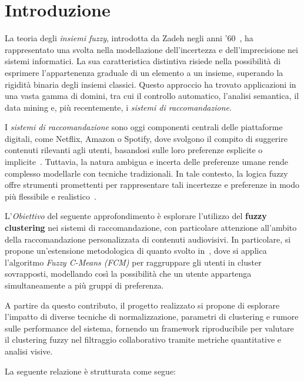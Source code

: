 \chapter{Introduzione}
\label{chap:chap1}

La teoria degli \emph{insiemi fuzzy}, introdotta da Zadeh negli anni ’60~\cite{Goguen_1973}, ha rappresentato una svolta nella modellazione dell’incertezza e dell’imprecisione nei sistemi informatici. La sua caratteristica distintiva risiede nella possibilità di esprimere l’appartenenza graduale di un elemento a un insieme, superando la rigidità binaria degli insiemi classici. Questo approccio ha trovato applicazioni in una vasta gamma di domini, tra cui il controllo automatico, l’analisi semantica, il data mining e, più recentemente, i \emph{sistemi di raccomandazione}.

I \emph{sistemi di raccomandazione} sono oggi componenti centrali delle piattaforme digitali, come Netflix, Amazon o Spotify, dove svolgono il compito di suggerire contenuti rilevanti agli utenti, basandosi sulle loro preferenze esplicite o implicite~\cite{554776b9726f44c582f01d870cefd26b}. Tuttavia, la natura ambigua e incerta delle preferenze umane rende complesso modellarle con tecniche tradizionali. In tale contesto, la logica fuzzy offre strumenti promettenti per rappresentare tali incertezze e preferenze in modo più flessibile e realistico~\cite{EKEL2006179}.

L'\emph{Obiettivo} del seguente approfondimento è esplorare l’utilizzo del \textbf{fuzzy clustering} nei sistemi di raccomandazione, con particolare attenzione all’ambito della raccomandazione personalizzata di contenuti audiovisivi. In particolare, si propone un’estensione metodologica di quanto svolto in~\cite{KOOHI2016134}, dove si applica l’algoritmo \emph{Fuzzy C-Means (FCM)} per raggruppare gli utenti in cluster sovrapposti, modellando così la possibilità che un utente appartenga simultaneamente a più gruppi di preferenza.

A partire da questo contributo, il progetto realizzato si propone di esplorare l’impatto di diverse tecniche di normalizzazione, parametri di clustering e rumore sulle performance del sistema, fornendo un framework riproducibile per valutare il clustering fuzzy nel filtraggio collaborativo tramite metriche quantitative e analisi visive.

La seguente relazione è strutturata come segue:

